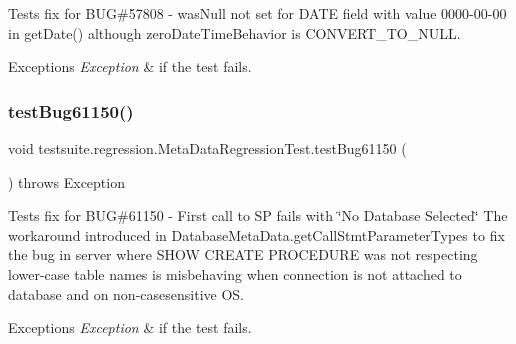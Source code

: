 Tests fix for B\+UG\#57808 -\/ was\+Null not set for D\+A\+TE field with value 0000-\/00-\/00 in get\+Date() although zero\+Date\+Time\+Behavior is C\+O\+N\+V\+E\+R\+T\+\_\+\+T\+O\+\_\+\+N\+U\+LL.


\begin{DoxyExceptions}{Exceptions}
{\em Exception} & if the test fails. \\
\hline
\end{DoxyExceptions}
\mbox{\label{classtestsuite_1_1regression_1_1_meta_data_regression_test_ab171769c1d241e02730a4b626b9bd150}} 
\subsubsection{\texorpdfstring{test\+Bug61150()}{testBug61150()}}
{\footnotesize\ttfamily void testsuite.\+regression.\+Meta\+Data\+Regression\+Test.\+test\+Bug61150 (\begin{DoxyParamCaption}{ }\end{DoxyParamCaption}) throws Exception}

Tests fix for B\+UG\#61150 -\/ First call to SP fails with \char`\"{}\+No Database Selected\char`\"{} The workaround introduced in Database\+Meta\+Data.\+get\+Call\+Stmt\+Parameter\+Types to fix the bug in server where S\+H\+OW C\+R\+E\+A\+TE P\+R\+O\+C\+E\+D\+U\+RE was not respecting lower-\/case table names is misbehaving when connection is not attached to database and on non-\/casesensitive OS.


\begin{DoxyExceptions}{Exceptions}
{\em Exception} & if the test fails. \\
\hline
\end{DoxyExceptions}
\mbox{\label{classtestsuite_1_1regression_1_1_meta_data_regression_test_a0dd9e6de4ad836964f235a4a27aed144}} 
